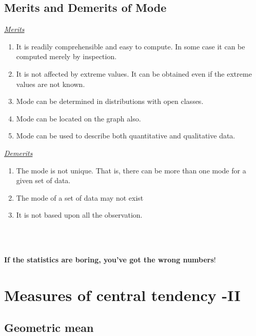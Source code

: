 \documentclass[
]{book}
\begin{document}
\hypertarget{merits-and-demerits-of-mode}{%
\section{Merits and Demerits of Mode}\label{merits-and-demerits-of-mode}}

\underline{\emph{Merits}}

\begin{enumerate}
\def\labelenumi{\arabic{enumi}.}
\item
  It is readily comprehensible and easy to compute. In some case it
  can be computed merely by inspection.
\item
  It is not affected by extreme values. It can be obtained even if the
  extreme values are not known.
\item
  Mode can be determined in distributions with open classes.
\item
  Mode can be located on the graph also.
\item
  Mode can be used to describe both quantitative and qualitative data.
\end{enumerate}

\underline{\emph{Demerits}}

\begin{enumerate}
\def\labelenumi{\arabic{enumi}.}
\item
  The mode is not unique. That is, there can be more than one mode for
  a given set of data.
\item
  The mode of a set of data may not exist
\item
  It is not based upon all the observation.
\end{enumerate}

~\\
\hspace*{0.333em}\\
\hspace*{0.333em}

\hypertarget{hello}{}
\textbf{If the statistics are boring, you've got the wrong numbers}!

\hypertarget{measures-of-central-tendency--ii}{%
\chapter{Measures of central tendency -II}\label{measures-of-central-tendency--ii}}

\hypertarget{geometric-mean}{%
\section{Geometric mean}\label{geometric-mean}}
\end{document}
